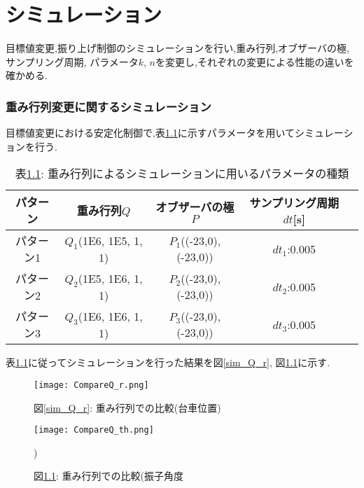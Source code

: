 \chapter{シミュレーション}
目標値変更,振り上げ制御のシミュレーションを行い,重み行列,オブザーバの極,サンプリング周期,
パラメータ$k$, $n$を変更し,それぞれの変更による性能の違いを確かめる.

\subsection{重み行列変更に関するシミュレーション}
目標値変更における安定化制御で,表\ref{sim_Q}に示すパラメータを用いてシミュレーションを行う.

\begin{table}[htbp]
    \begin{center}
        \caption{表\ref{sim_Q}: 重み行列によるシミュレーションに用いるパラメータの種類}
        \begin{tabular}{|c|c|c|c|c|} \hline
            パターン & 重み行列$Q$ & オブザーバの極$P$ & サンプリング周期$dt$[s] \\ \hline \hline
            パターン1 & $Q_1$(1E6, 1E5, 1, 1) & $P_1$((-23,0), (-23,0)) & $dt_1$:0.005 \\ \hline
            パターン2 & $Q_2$(1E5, 1E6, 1, 1) & $P_2$((-23,0), (-23,0)) & $dt_2$:0.005 \\ \hline
            パターン3 & $Q_3$(1E6, 1E6, 1, 1) & $P_3$((-23,0), (-23,0)) & $dt_3$:0.005 \\ \hline
        \end{tabular}
        \label{sim_Q}
    \end{center}
\end{table}

表\ref{sim_Q}に従ってシミュレーションを行った結果を図\ref{sim_Q_r}, 図\ref{sim_Q_th}に示す.

\begin{figure}[htbp]
    \begin{minipage}{0.5\hsize}
        \begin{center}
            \texttt{[image: CompareQ\_r.png]}
            \caption{図\ref{sim_Q_r}: 重み行列での比較(台車位置)}
            \label{sim_Q_r}
        \end{center}
    \end{minipage}
    \begin{minipage}{0.5\hsize}
        \begin{center}
            \texttt{[image: CompareQ\_th.png]}
            \caption{図\ref{sim_Q_th}: 重み行列での比較(振子角度})
            \label{sim_Q_th}
        \end{center}
    \end{minipage}
\end{figure}

